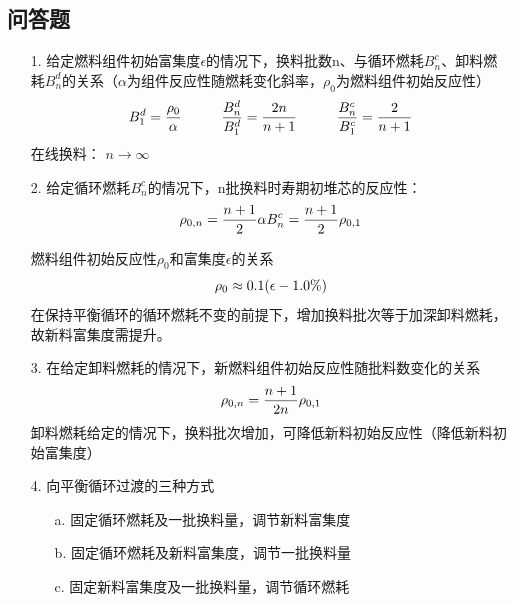 \documentclass[openany]{ctexart}
\numberwithin{equation}{section} %
\begin{document}
\subsection{问答题}
\begin{itemize}
	\item [1.] 给定燃料组件初始富集度$\epsilon$的情况下，换料批数n、与循环燃耗$B^c_{n}$、卸料燃耗$B^d_{n}$的关系（$\alpha$为组件反应性随燃耗变化斜率，$\rho _{0}$为燃料组件初始反应性）\newline
	\begin{equation}
 		\large	B^d_{1}=\dfrac{\rho _{0}}{\alpha}
		\hspace*{1cm}
		\dfrac{B^d_{n}}{B^d_{1}}=\dfrac{2n}{n+1}
		\hspace*{1cm}
		\dfrac{B^c_{n}}{B^c_{1}}=\dfrac{2}{n+1}
	\end{equation}
	在线换料： $n \to \infty$
	
	\vspace{0.15cm}
	
	\item [2.]给定循环燃耗$B^c_{n}$的情况下，n批换料时寿期初堆芯的反应性：
	\begin{equation}
		\large \rho _{0,n} = \dfrac{n+1}{2} \alpha B^c_{n} = \dfrac{n+1}{2} \rho _{0,1}
	\end{equation}
	
	燃料组件初始反应性$\rho _{0}$和富集度$\epsilon$的关系
	\begin{equation}
		\large \rho _{0} \approx 0.1(\epsilon - 1.0\%)
	\end{equation}
	在保持平衡循环的循环燃耗不变的前提下，增加换料批次等于加深卸料燃耗，故新料富集度需提升。
	
	\vspace{0.15cm}
	
	\item [3.]在给定卸料燃耗的情况下，新燃料组件初始反应性随批料数变化的关系
	\begin{equation}
		\large \rho _{0,n} = \dfrac{n+1}{2n} \rho _{0,1}
	\end{equation}
	卸料燃耗给定的情况下，换料批次增加，可降低新料初始反应性（降低新料初始富集度）
	
	\vspace{0.15cm}
	
	\item  [4.]向平衡循环过渡的三种方式
	\begin{itemize}
		\vspace{-0.01cm}
		\item  [a.]固定循环燃耗及一批换料量，调节新料富集度
		\vspace{-0.01cm}
			\item  [b.]固定循环燃耗及新料富集度，调节一批换料量
			\vspace{-0.01cm}
				\item  [c.]固定新料富集度及一批换料量，调节循环燃耗
	\end{itemize}
	
\end{itemize}
\end{document}
